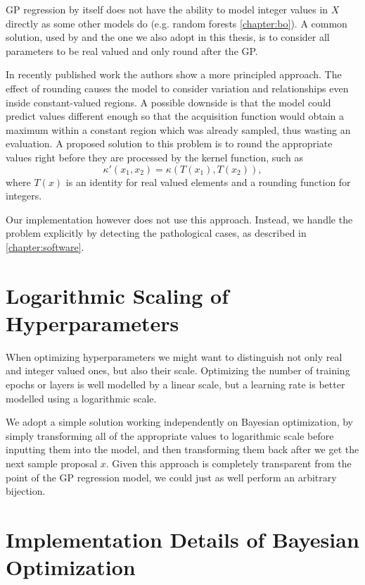 GP regression by itself does not have the ability to model integer values in
$X$ directly as some other models do (e.g. random forests
\autoref{chapter:bo}). A common solution, used by \citep{spearmint} and the one
we also adopt in this thesis, is to consider all parameters to be real valued
and only round after the GP.

In recently published work \cite{integer-valued-gp} the authors show a more
principled approach. The effect of rounding causes the model to consider
variation and relationships even inside constant-valued regions. A possible
downside is that the model could predict values different enough so that the
acquisition function would obtain a maximum within a constant region which was
already sampled, thus wasting an evaluation. A proposed solution to this
problem is to round the appropriate values right before they are processed by
the kernel function, such as $$\kappa'(x_1, x_2) = \kappa(T(x_1), T(x_2)),$$
where $T(x)$ is an identity for real valued elements and a rounding function
for integers.

Our implementation however does not use this approach. Instead, we handle the
problem explicitly by detecting the pathological cases, as described in
\autoref{chapter:software}.

\section{Logarithmic Scaling of Hyperparameters}

When optimizing hyperparameters we might want to distinguish not only real and
integer valued ones, but also their scale. Optimizing the number of training
epochs or layers is well modelled by a linear scale, but a learning rate is
better modelled using a logarithmic scale.

We adopt a simple solution working independently on Bayesian optimization, by
simply transforming all of the appropriate values to logarithmic scale before
inputting them into the model, and then transforming them back after we get the
next sample proposal $x$. Given this approach is completely transparent from
the point of the GP regression model, we could just as well perform an
arbitrary bijection.


\section{Implementation Details of Bayesian Optimization}
\label{section:bopt-alg}

